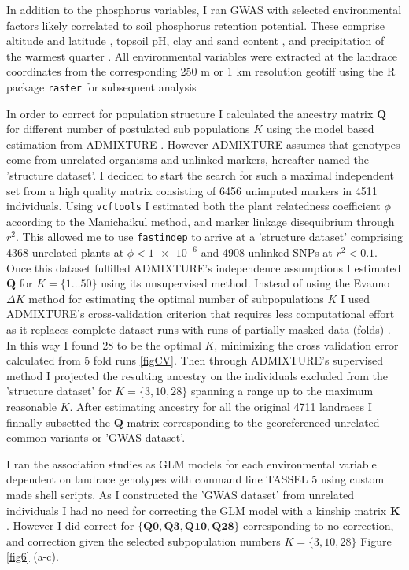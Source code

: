 \documentclass[10pt,letterpaper]{article}
\begin{document}
In addition to the phosphorus variables, I ran GWAS with selected environmental factors likely correlated to soil phosphorus retention potential. These comprise altitude and latitude \cite{romeronavarro2017}, topsoil pH, clay and sand content \cite{hengl2017}, and precipitation of the warmest quarter \cite{karger2017}. All environmental variables were extracted at the landrace coordinates from the corresponding 250 m or 1 km resolution geotiff using the R package \texttt{raster} for subsequent analysis \cite{hijmans2017,rcoreteam2018}

In order to correct for population structure I calculated the ancestry matrix $\mathbf{Q}$ for different number of postulated sub populations $K$ using the model based estimation from ADMIXTURE \cite{alexander2009}. However ADMIXTURE assumes that genotypes come from unrelated organisms and unlinked markers, hereafter named the 'structure dataset'. I decided to start the search for such a maximal independent set from a high quality matrix consisting of 6456 unimputed markers in 4511 individuals. Using \texttt{vcftools} \cite{danecek2011} I estimated both the plant relatedness coefficient $\phi$  according to the Manichaikul \cite{manichaikul2010} method,  and marker linkage disequibrium through $r^2$. This allowed me to use \texttt{fastindep} \cite{abraham2014} to arrive at a 'structure dataset' comprising 4368 unrelated plants at $\phi < \num{1e-6}$ and 4908 unlinked SNPs at $r^2 < 0.1$. Once this dataset fulfilled  ADMIXTURE's independence assumptions I estimated $\mathbf{Q}$ for $K = \{1 \ldots 50\}$ using its unsupervised method. Instead of using the Evanno $\Delta K$ method \cite{evanno2005}  for estimating the optimal number of subpopulations $K$ I used  ADMIXTURE's cross-validation criterion that requires less computational effort as it replaces complete dataset runs with runs of partially masked data (folds) \cite{alexander2009,lawson2018}. In this way I found  28 to be the optimal $K$, minimizing the cross validation error calculated from 5 fold runs \ref{figCV}. Then through ADMIXTURE's supervised method I projected the resulting ancestry on the individuals excluded from the 'structure dataset' for $K = \{3,10,28\}$  spanning a range up to the maximum reasonable $K$. After estimating ancestry for all the original 4711 landraces I finnally subsetted the $\mathbf{Q}$ matrix corresponding to the georeferenced unrelated common variants or 'GWAS dataset'. 

I ran the association studies as GLM models for each environmental variable  dependent on landrace genotypes with command line TASSEL 5 \cite{bradbury2007} using custom made shell scripts. As I constructed the 'GWAS dataset' from unrelated individuals I had no need for correcting the GLM model with a kinship matrix $\mathbf{K}$. However I did correct for $\mathbf{\{Q0, Q3, Q10, Q28\}}$ corresponding to no correction, and correction given the selected subpopulation numbers $K = \{3,10,28\}$ Figure \ref{fig6} (a-c).
\end{document}
